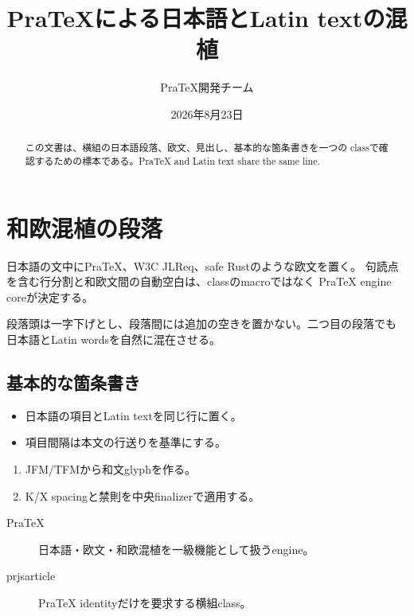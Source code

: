 \documentclass[a4paper,10pt]{prjsarticle}
\title{PraTeXによる日本語とLatin textの混植}
\author{PraTeX開発チーム}
\date{2026年8月23日}
\begin{document}
\maketitle

\begin{abstract}
この文書は、横組の日本語段落、欧文、見出し、基本的な箇条書きを一つの
classで確認するための標本である。PraTeX and Latin text share the same line.
\end{abstract}

\section{和欧混植の段落}
日本語の文中にPraTeX、W3C JLReq、safe Rustのような欧文を置く。
句読点を含む行分割と和欧文間の自動空白は、classのmacroではなく
PraTeX engine coreが決定する。

段落頭は一字下げとし、段落間には追加の空きを置かない。二つ目の段落でも
日本語とLatin wordsを自然に混在させる。

\subsection{基本的な箇条書き}
\begin{itemize}
  \item 日本語の項目とLatin textを同じ行に置く。
  \item 項目間隔は本文の行送りを基準にする。
\end{itemize}

\begin{enumerate}
  \item JFM/TFMから和文glyphを作る。
  \item K/X spacingと禁則を中央finalizerで適用する。
\end{enumerate}

\begin{description}
  \item[PraTeX] 日本語・欧文・和欧混植を一級機能として扱うengine。
  \item[prjsarticle] PraTeX identityだけを要求する横組class。
\end{description}
\end{document}
